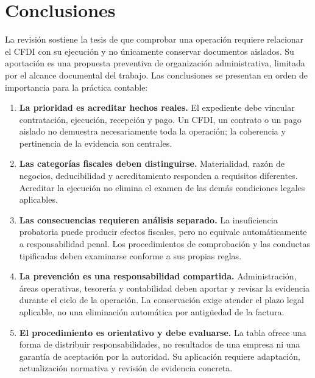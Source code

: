 \section{Conclusiones}

La revisión sostiene la tesis de que comprobar una operación requiere
relacionar el CFDI con su ejecución y no únicamente conservar documentos
aislados. Su aportación es una propuesta preventiva de organización
administrativa, limitada por el alcance documental del trabajo. Las
conclusiones se presentan en orden de importancia para la práctica contable:

\begin{enumerate}[label=\arabic*.]
  \item \textbf{La prioridad es acreditar hechos reales.} El expediente debe
  vincular contratación, ejecución, recepción y pago. Un CFDI, un contrato o
  un pago aislado no demuestra necesariamente toda la operación; la
  coherencia y pertinencia de la evidencia son centrales.

  \item \textbf{Las categorías fiscales deben distinguirse.} Materialidad,
  razón de negocios, deducibilidad y acreditamiento responden a requisitos
  diferentes. Acreditar la ejecución no elimina el examen de las demás
  condiciones legales aplicables.

  \item \textbf{Las consecuencias requieren análisis separado.} La
  insuficiencia probatoria puede producir efectos fiscales, pero no equivale
  automáticamente a responsabilidad penal. Los procedimientos de comprobación
  y las conductas tipificadas deben examinarse conforme a sus propias reglas.

  \item \textbf{La prevención es una responsabilidad compartida.} Administración,
  áreas operativas, tesorería y contabilidad deben aportar y revisar la
  evidencia durante el ciclo de la operación. La conservación exige atender
  el plazo legal aplicable, no una eliminación automática por antigüedad
  de la factura.

  \item \textbf{El procedimiento es orientativo y debe evaluarse.} La tabla
  ofrece una forma de distribuir responsabilidades, no resultados de una
  empresa ni una garantía de aceptación por la autoridad. Su aplicación
  requiere adaptación, actualización normativa y revisión de evidencia
  concreta.
\end{enumerate}


